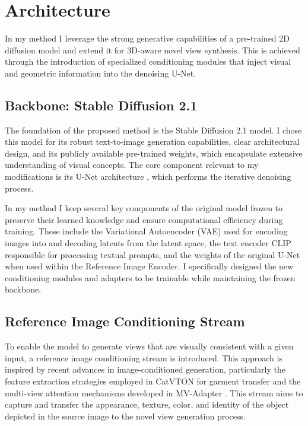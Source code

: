 \section{Architecture}\label{sec:architectural-framework}
In my method I leverage the strong generative capabilities of a pre-trained 2D diffusion model and extend it for 3D-aware novel view synthesis. This is achieved through the introduction of specialized conditioning modules that inject visual and geometric information into the denoising U-Net.

\subsection{Backbone: Stable Diffusion 2.1}
The foundation of the proposed method is the Stable Diffusion 2.1 model. I chose this model for its robust text-to-image generation capabilities, clear architectural design, and its publicly available pre-trained weights, which encapsulate extensive understanding of visual concepts. The core component relevant to my modifications is its U-Net architecture \cite{unet}, which performs the iterative denoising process.

In my method I keep several key components of the original model frozen to preserve their learned knowledge and ensure computational efficiency during training. These include the Variational Autoencoder (VAE) \cite{vae} used for encoding images into and decoding latents from the latent space, the text encoder CLIP \cite{clip} responsible for processing textual prompts, and the weights of the original U-Net when used within the Reference Image Encoder. I specifically designed the new conditioning modules and adapters to be trainable while maintaining the frozen backbone.

\subsection{Reference Image Conditioning Stream}
To enable the model to generate views that are visually consistent with a given input, a reference image conditioning stream is introduced. This approach is inspired by recent advances in image-conditioned generation, particularly the feature extraction strategies employed in CatVTON \cite{catvton} for garment transfer and the multi-view attention mechanisms developed in MV-Adapter \cite{mvadapter}. This stream aims to capture and transfer the appearance, texture, color, and identity of the object depicted in the source image to the novel view generation process.

